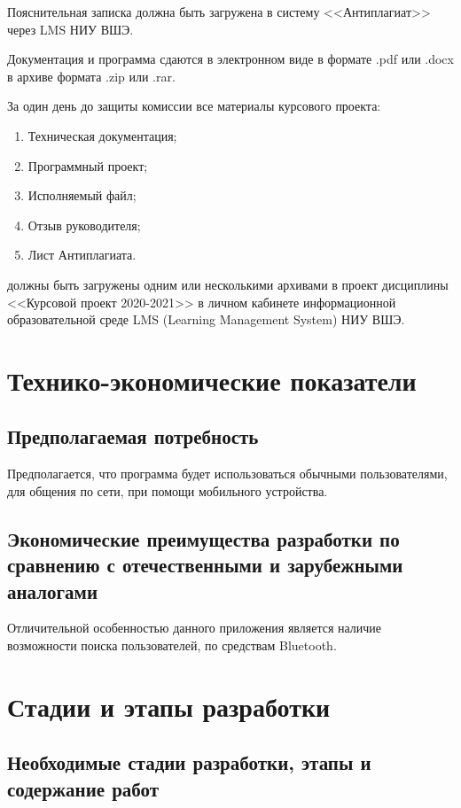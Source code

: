\documentclass[techtask]{espd}
\begin{document}
Пояснительная записка должна быть загружена в систему <<Антиплагиат>> через LMS НИУ ВШЭ.

Документация и программа сдаются в электронном виде в формате .pdf или .docx в архиве формата .zip или .rar.

За один день до защиты комиссии все материалы курсового проекта:
\begin{enumerate}
\item Техническая документация;
\item Программный проект;
\item Исполняемый файл;
\item Отзыв руководителя;
\item Лист Антиплагиата.
\end{enumerate}
должны быть загружены одним или несколькими архивами в проект дисциплины <<Курсовой проект 2020-2021>> в личном кабинете информационной образовательной среде LMS (Learning Management System) НИУ ВШЭ.

\section{Технико-экономические показатели}
\subsection{Предполагаемая потребность}
Предполагается, что программа будет использоваться обычными пользователями, для общения по сети, при помощи мобильного устройства.

\subsection{Экономические преимущества разработки по сравнению с отечественными и зарубежными аналогами}
Отличительной особенностью данного приложения является наличие возможности поиска пользователей, по средствам Bluetooth.

\section{Стадии и этапы разработки}
\subsection{Необходимые стадии разработки, этапы и содержание работ}
\end{document}
